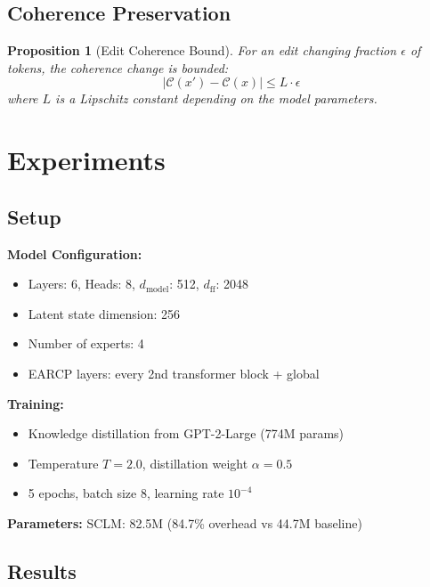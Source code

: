 \documentclass[11pt,a4paper]{article}
\newtheorem{proposition}{Proposition}
\newcommand{\coherence}{\mathcal{C}}
\begin{document}
\subsection{Coherence Preservation}

\begin{proposition}[Edit Coherence Bound]
For an edit changing fraction $\epsilon$ of tokens, the coherence change is bounded:
\begin{equation}
|\coherence(x') - \coherence(x)| \leq L \cdot \epsilon
\end{equation}
where $L$ is a Lipschitz constant depending on the model parameters.
\end{proposition}

\section{Experiments}

\subsection{Setup}

\textbf{Model Configuration:}
\begin{itemize}
    \item Layers: 6, Heads: 8, $d_{\text{model}}$: 512, $d_{\text{ff}}$: 2048
    \item Latent state dimension: 256
    \item Number of experts: 4
    \item EARCP layers: every 2nd transformer block + global
\end{itemize}

\textbf{Training:}
\begin{itemize}
    \item Knowledge distillation from GPT-2-Large (774M params)
    \item Temperature $T = 2.0$, distillation weight $\alpha = 0.5$
    \item 5 epochs, batch size 8, learning rate $10^{-4}$
\end{itemize}

\textbf{Parameters:} SCLM: 82.5M (84.7\% overhead vs 44.7M baseline)

\subsection{Results}
\end{document}
